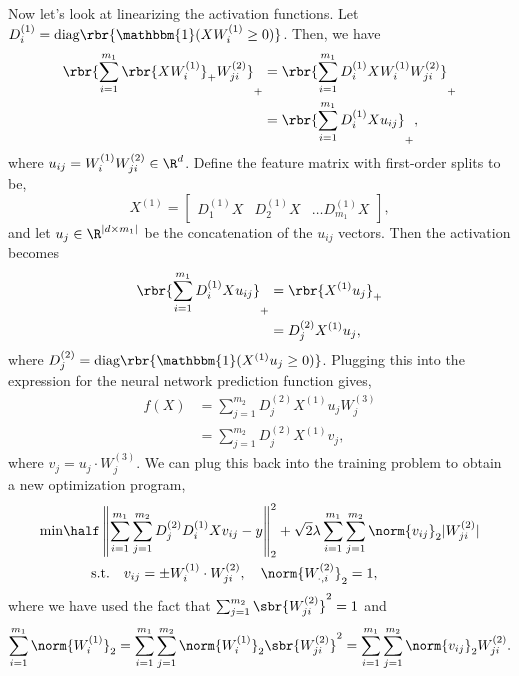 \documentclass{article}
\newcommand{\wone}{W^{(1)}}
\newcommand{\wtwo}{W^{(2)}}
\newcommand{\wthree}{W^{(3)}}
\newcommand{\Done}{D^{(1)}}
\newcommand{\Dtwo}{D^{(2)}}
\newcommand{\Xone}{X^{(1)}}
\begin{document}
Now let's look at linearizing the activation functions.
Let \( \Done_i = \text{diag}\rbr{\mathbbm{1}(X \wone_i \geq 0)} \).
Then, we have
\begin{align*}
    \rbr{\sum_{i = 1}^{m_1} \rbr{X \wone_i}_+ \wtwo_{ji}}_+
     & = \rbr{\sum_{i = 1}^{m_1} \Done_i X \wone_i \wtwo_{ji}}_+ \\
     & = \rbr{\sum_{i = 1}^{m_1} \Done_i X u_{ij}}_+,
\end{align*}
where \( u_{ij} = \wone_i \wtwo_{ji} \in \R^{d} \).
Define the feature matrix with first-order splits to be,
\[
    \Xone =
    \begin{bmatrix}
        \Done_1 X & \Done_2 X & \ldots \Done_{m_1}
        X
    \end{bmatrix}
    , \] and let \( u_j \in \R^{|d \times m_1|} \) be the
concatenation of the \( u_{ij} \) vectors.
Then the activation becomes
\begin{align*}
    \rbr{\sum_{i = 1}^{m_1} \Done_i X u_{ij}}_+
     & = \rbr{\Xone u_j}_+  \\
     & = \Dtwo_j \Xone u_j,
\end{align*}
where \( \Dtwo_j = \text{diag}\rbr{\mathbbm{1}(\Xone u_j \geq 0)} \).
Plugging this into the expression for the neural network prediction
function gives,
\begin{align*}
    f(X)
     & = \sum_{j = 1}^{m_2} \Dtwo_j \Xone u_j \wthree_j \\
     & = \sum_{j = 1}^{m_2} \Dtwo_j \Xone v_j,
\end{align*}
where \( v_j = u_j \cdot \wthree_j \).
We can plug this back into the training problem to obtain a new optimization
program,
\begin{equation}
    \begin{aligned}
        \min
         & \half \left\|
        \sum_{i = 1}^{m_1} \sum_{j = 1}^{m_2} \Dtwo_j \Done_i X v_{ij}
        - y
        \right\|_2^2
        + \sqrt{2}\lambda
        \sum_{i=1}^{m_1} \sum_{j = 1}^{m_2}
        \norm{v_{ij}}_2 |\wtwo_{ji}|      \\
         & \hspace{2em} \text{s.t.} \quad
        v_{ij} = \pm \wone_{i} \cdot \wtwo_{ji}, \quad \norm{\wtwo_{\cdot, i}}_2 = 1,
    \end{aligned}
\end{equation}
where we have used the fact that \( \sum_{j=1}^{m_2} \sbr{\wtwo_{ji}}^2 = 1 \) and
\[
    \sum_{i=1}^{m_1} \norm{\wone_i}_2
    = \sum_{i=1}^{m_1} \sum_{j=1}^{m_2} \norm{\wone_i}_2 \sbr{\wtwo_{ji}}^2
    = \sum_{i=1}^{m_1} \sum_{j=1}^{m_2} \norm{v_{ij}}_2 \wtwo_{ji}.
\]
\end{document}
